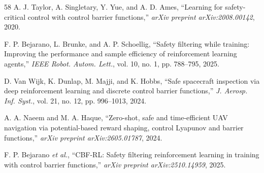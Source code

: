 \documentclass[conference]{IEEEtran}
\begin{document}
\begin{thebibliography}{58}
A. J. Taylor, A. Singletary, Y. Yue, and A. D. Ames,
``Learning for safety-critical control with control barrier functions,''
\emph{arXiv preprint arXiv:2008.00142}, 2020.

F. P. Bejarano, L. Brunke, and A. P. Schoellig,
``Safety filtering while training: Improving the performance and sample efficiency of reinforcement learning agents,''
\emph{IEEE Robot. Autom. Lett.}, vol. 10, no. 1, pp. 788--795, 2025.

D. Van Wijk, K. Dunlap, M. Majji, and K. Hobbs,
``Safe spacecraft inspection via deep reinforcement learning and discrete control barrier functions,''
\emph{J. Aerosp. Inf. Syst.}, vol. 21, no. 12, pp. 996--1013, 2024.

A. A. Naeem and M. A. Haque,
``Zero-shot, safe and time-efficient UAV navigation via potential-based reward shaping, control Lyapunov and barrier functions,''
\emph{arXiv preprint arXiv:2605.01787}, 2024.

F. P. Bejarano \emph{et al.},
``CBF-RL: Safety filtering reinforcement learning in training with control barrier functions,''
\emph{arXiv preprint arXiv:2510.14959}, 2025.

\end{thebibliography}
\end{document}
